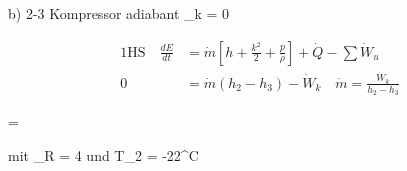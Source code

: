 b) 2-3 Kompressor adiabant \quad {}_k = 0

\begin{align*}
\text{1HS} \quad \frac{dE}{dt} &= \dot{m} \left[ h + \frac{k^2}{2} + \frac{p}{\rho} \right] + \dot{Q} - \sum \dot{W}_u \\
0 &= \dot{m} (h_2 - h_3) - \dot{W}_k \quad \dot{m} = \frac{\dot{W}_k}{h_2 - h_3}
\end{align*}

 =

mit \quad {}_R = 4  \quad und \quad T_2 = -22^\circ C